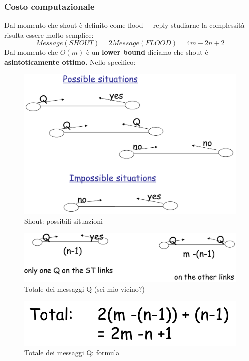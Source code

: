 \documentclass[12pt]{article}
\begin{document}
		\subsubsection{Costo computazionale}
			Dal momento che shout è definito come flood + reply studiarne la complessità risulta essere molto semplice: 
			$$Message(SHOUT) = 2Message(FLOOD) = 4m-2n+2 $$
			Dal momento che $O(m)$ è un \textbf{lower bound} diciamo che shout è \textbf{asintoticamente ottimo.}
			Nello specifico:
			\begin{figure}[h!]
				\centering
				\includegraphics[scale=0.25]{img/shout1.png}
				\caption{Shout: possibili situazioni}
			\end{figure}
			\begin{figure}[h!]
				\centering
				\includegraphics[scale=0.25]{img/shoutmess.png}
				\caption{Totale dei messaggi Q (sei mio vicino?)}
			\end{figure}
			\begin{figure}[h!]
				\centering
				\includegraphics[scale=0.25]{img/shoutmess1.png}
				\caption{Totale dei messaggi Q: formula}
			\end{figure}
\end{document}
